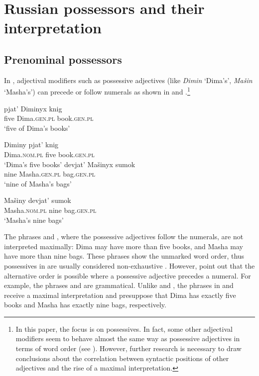\documentclass[output=paper]{langscibook}
\begin{document}
\section{Russian possessors and their interpretation}\label{FW}\largerpage
\subsection{Prenominal possessors}\label{PreP}

In , adjectival modifiers such as possessive adjectives (like \textit{Dimin} `Dima's', \textit{Mašin} `Masha's') can precede or follow numerals as shown in  and .\footnote{In this paper, the focus is on possessives. In fact, some other adjectival modifiers seem to behave almost the same way as possessive adjectives in terms of word order (see ). However, further research is necessary to draw conclusions about the correlation between syntactic positions of other adjectives and the rise of a maximal interpretation.}

\ea\label{Num-Poss}
\ea\label{NumPoss} \gll pjat' Diminyx knig\\
five Dima.\textsc{gen.pl} book.\textsc{gen.pl}\\
\glt `five of Dima's books'

\ex\label{PossNum} \gll Diminy pjat' knig\\
Dima.\textsc{nom.pl} five book.\textsc{gen.pl}\\
\glt `Dima's five books' \hfill \citep[173]{Kagan.Pereltsvaig2012}
\z\ex\label{Num-Poss2}
\ea\label{NumPoss2} \gll devjat' Mašinyx sumok\\
nine Masha.\textsc{gen.pl} bag.\textsc{gen.pl}\\
\glt `nine of Masha's bags'

\ex\label{PossNum2} \gll Mašiny devjat' sumok\\
Masha.\textsc{nom.pl} nine bag.\textsc{gen.pl}\\
\glt `Masha's nine bags'
\z\z

\noindent The phrases  and , where the possessive adjectives follow the numerals, are not interpreted maximally: Dima may have more than five books, and Masha may have more than nine bags. These phrases show the unmarked word order, thus possessives in  are usually considered non-exhaustive \citep[see, e.g.,][]{Partee2006}. However, \citet{Kagan.Pereltsvaig2012} point out that the alternative order is possible where a possessive adjective precedes a numeral. For example, the phrases  and  are grammatical. Unlike  and , the phrases in  and  receive a maximal interpretation and presuppose that Dima has exactly five books and Masha has exactly nine bags, respectively.
\end{document}
